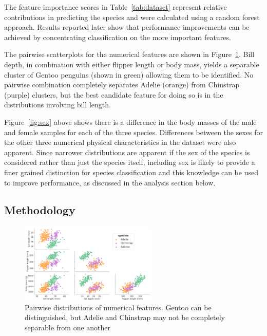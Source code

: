 \documentclass[12pt]{article}
\begin{document}
The feature importance scores in Table~\ref{tab:dataset} represent 
relative contributions in predicting the species and were calculated using a random forest approach.
Results reported later show that performance improvements can be achieved by
concentrating classification on the more important features.

The pairwise scatterplots for the numerical features are shown in Figure~\ref{fig:pairwise}. 
Bill depth, in combination with either flipper length or body mass, 
yields a separable cluster of Gentoo penguins (shown in green) allowing them to be identified. 
No pairwise combination completely separates Adelie (orange) from Chinstrap (purple) clusters, 
but the best candidate feature for doing so is in the distributions involving bill length.

Figure~\ref{fig:sex} above shows there is a difference in the body masses of the male and female samples for each of the three species. 
Differences between the sexes for the other three numerical physical characteristics in the dataset were also apparent. 
Since narrower distributions are apparent if the sex of the species is considered rather than just the species itself, 
including sex is likely to provide a finer grained distinction for species classification 
and this knowledge can be used to improve performance, as discussed in the analysis section below. 

\subsection*{Methodology}

\begin{figure} %
  \centering
  \vspace{-3\baselineskip} %
  \includegraphics[width=0.58\textwidth]{pairwise.png} %
  \vspace{-0.5\baselineskip} %
  \caption{Pairwise distributions of numerical features. Gentoo can be distinguished, 
  but Adelie and Chinstrap may not be completely separable from one another}
  \vspace{-0.5\baselineskip} %
  \label{fig:pairwise}
\end{figure}
\end{document}
